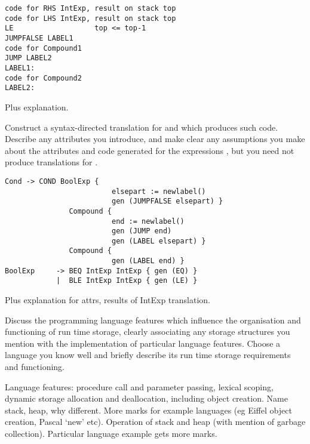 \begin{questions}
\begin{subquestions}
\begin{subsubquestions}
\begin{modelanswer}
\begin{verbatim}
code for RHS IntExp, result on stack top
code for LHS IntExp, result on stack top
LE                   top <= top-1
JUMPFALSE LABEL1
code for Compound1
JUMP LABEL2
LABEL1:
code for Compound2
LABEL2:
\end{verbatim}
Plus explanation.
\end{modelanswer}

\subsubquestion
        Construct a syntax-directed translation for 
         and  which produces such code.
        Describe any attributes you
        introduce, and make clear any assumptions you make about 
        the attributes and code generated for the
        expressions , but you need not produce translations for
        .
\begin{modelanswer}
\begin{verbatim}
Cond -> COND BoolExp { 
                         elsepart := newlabel()
                         gen (JUMPFALSE elsepart) }
               Compound {
                         end := newlabel()
                         gen (JUMP end)
                         gen (LABEL elsepart) }
               Compound {
                         gen (LABEL end) }
BoolExp     -> BEQ IntExp IntExp { gen (EQ) }
            |  BLE IntExp IntExp { gen (LE) }
\end{verbatim}
Plus explanation for attrs, results of IntExp translation.
\end{modelanswer}
\end{subsubquestions}

\end{subquestions}

\question

\begin{subquestions}


\subquestion
Discuss the programming language features which influence
the organisation and functioning of run time storage,
clearly associating any storage structures you
mention with the implementation of particular language features.
Choose a language you know well and briefly describe
its run time storage requirements and functioning.
\begin{modelanswer}
Language features: procedure call and parameter passing,
lexical scoping, dynamic storage allocation and deallocation,
including object creation. Name stack, heap, why different.
More marks for example languages
(eg Eiffel object creation, Pascal `new' etc). Operation of
stack and heap (with mention of garbage collection).
Particular language example gets more marks.
\end{modelanswer}


\end{subquestions}
\end{questions}
